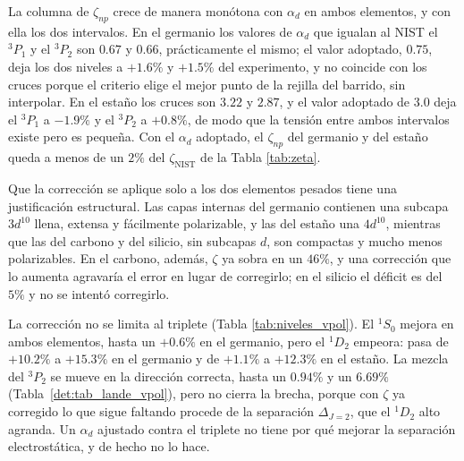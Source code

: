 La columna de $\zeta_{np}$ crece de manera monótona con $\alpha_d$ en ambos elementos, y con ella los dos intervalos. En el germanio los valores de $\alpha_d$ que igualan al NIST el $^3P_1$ y el $^3P_2$ son $0.67$ y $0.66$, prácticamente el mismo; el valor adoptado, $0.75$, deja los dos niveles a $+1.6\%$ y $+1.5\%$ del experimento, y no coincide con los cruces porque el criterio elige el mejor punto de la rejilla del barrido, sin interpolar. En el estaño los cruces son $3.22$ y $2.87$, y el valor adoptado de $3.0$ deja el $^3P_1$ a $-1.9\%$ y el $^3P_2$ a $+0.8\%$, de modo que la tensión entre ambos intervalos existe pero es pequeña. Con el $\alpha_d$ adoptado, el $\zeta_{np}$ del germanio y del estaño queda a menos de un $2\%$ del $\zeta_{\text{NIST}}$ de la Tabla \ref{tab:zeta}.

Que la corrección se aplique solo a los dos elementos pesados tiene una justificación estructural. Las capas internas del germanio contienen una subcapa $3d^{10}$ llena, extensa y fácilmente polarizable, y las del estaño una $4d^{10}$, mientras que las del carbono y del silicio, sin subcapas $d$, son compactas y mucho menos polarizables. En el carbono, además, $\zeta$ ya sobra en un $46\%$, y una corrección que lo aumenta agravaría el error en lugar de corregirlo; en el silicio el déficit es del $5\%$ y no se intentó corregirlo.

\begin{table}[htbp]
    \centering
    
    \caption[Niveles del germanio y del estaño con polarización de las capas internas]{Niveles (cm$^{-1}$) del germanio y del estaño sin y con la corrección de polarización de las capas internas, con el $\alpha_d$ adoptado ($0.75$ y $3.0$) y $r_c = 1.0\,a_0$, frente al NIST.}
    \label{tab:niveles_vpol}
\end{table}

La corrección no se limita al triplete (Tabla \ref{tab:niveles_vpol}). El $^1S_0$ mejora en ambos elementos, hasta un $+0.6\%$ en el germanio, pero el $^1D_2$ empeora: pasa de $+10.2\%$ a $+15.3\%$ en el germanio y de $+1.1\%$ a $+12.3\%$ en el estaño. La mezcla del $^3P_2$ se mueve en la dirección correcta, hasta un $0.94\%$ y un $6.69\%$ (Tabla~\ref{det:tab_lande_vpol}), pero no cierra la brecha, porque con $\zeta$ ya corregido lo que sigue faltando procede de la separación $\Delta_{J=2}$, que el $^1D_2$ alto agranda. Un $\alpha_d$ ajustado contra el triplete no tiene por qué mejorar la separación electrostática, y de hecho no lo hace.

